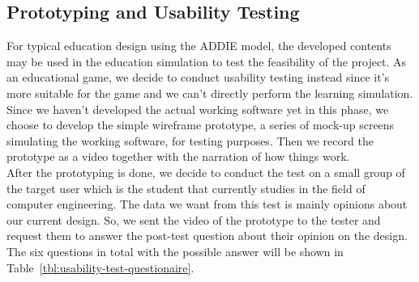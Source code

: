 \documentclass[12pt,oneside,openright,a4paper]{cpe-english-project}
\begin{document}
\subsection{Prototyping and Usability Testing}
For typical education design using the ADDIE model, the developed contents may be used in the education simulation to test the feasibility of the project. As an educational game, we decide to conduct usability testing instead since it's more suitable for the game and we can't directly perform the learning simulation. \\
Since we haven't developed the actual working software yet in this phase, we choose to develop the simple wireframe prototype, a series of mock-up screens simulating the working software, for testing purposes. Then we record the prototype as a video together with the narration of how things work. \\
After the prototyping is done, we decide to conduct the test on a small group of the target user which is the student that currently studies in the field of computer engineering. The data we want from this test is mainly opinions about our current design. So, we sent the video of the prototype to the tester and request them to answer the post-test question about their opinion on the design. The six questions in total with the possible answer will be shown in Table~\ref{tbl:usability-test-questionaire}.
\end{document}
